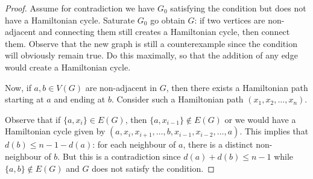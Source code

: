 \documentclass[12pt, a4paper]{book}
\theoremstyle{nonumberplain}
\newtheorem{proof}{Proof}
\begin{document}
\begin{proof}
    Assume for contradiction we have $G_0$ satisfying the condition but does not have a Hamiltonian cycle.
    Saturate $G_0$ go obtain $G$: if two vertices are non-adjacent and connecting them still creates a Hamiltonian cycle, then connect them.
    Observe that the new graph is still a counterexample since the condition will obviously remain true.
    Do this maximally, so that the addition of any edge would create a Hamiltonian cycle.

    Now, if $a,b\in V(G)$ are non-adjacent in $G$, then there exists a Hamiltonian path starting at $a$ and ending at $b$.
    Consider such a Hamiltonian path $(x_1,x_2,\ldots,x_n)$.
    \begin{center}
    \end{center}
    Observe that if $\{a,x_i\}\in E(G)$, then $\{a,x_{i-1}\}\notin E(G)$ or we would have a Hamiltonian cycle given by $(a,x_i,x_{i+1},\ldots,b,x_{i-1},x_{i-2},\ldots,a)$.
    This implies that $d(b)\leq n-1-d(a)$: for each neighbour of $a$, there is a distinct non-neighbour of $b$.
    But this is a contradiction since $d(a)+d(b)\leq n-1$ while $\{a,b\}\notin E(G)$ and $G$ does not satisfy the condition.
\end{proof}
\end{document}
